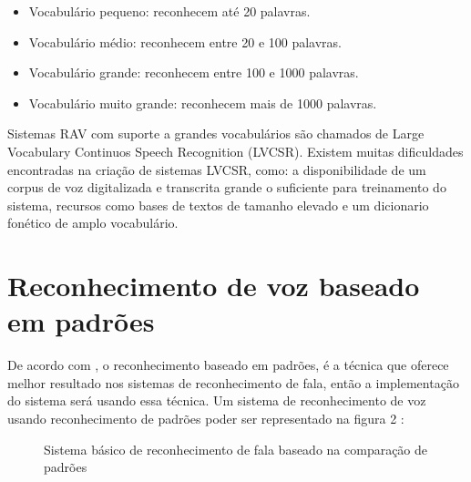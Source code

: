 \begin{enumerate}[(A)]
\begin{itemize}
\item Vocabulário pequeno: reconhecem até 20 palavras. 
\item Vocabulário médio: reconhecem entre 20 e 100 palavras. 
\item Vocabulário grande: reconhecem entre 100 e 1000 palavras. 
\item Vocabulário muito grande: reconhecem mais de 1000 palavras. 
\end{itemize}

Sistemas RAV com suporte a grandes vocabulários são chamados de Large Vocabulary Continuos Speech Recognition (LVCSR). Existem muitas dificuldades encontradas na criação de sistemas LVCSR, como: a disponibilidade de um corpus de voz digitalizada e transcrita grande o suficiente para treinamento do sistema, recursos como bases de textos de
tamanho elevado e um dicionario fonético de amplo vocabulário.


\end{enumerate}

\section{Reconhecimento de voz baseado em padrões}\label{sec:red_neu}
De acordo com , o reconhecimento baseado em padrões, é a técnica que oferece melhor resultado nos sistemas de reconhecimento de fala, então a implementação do sistema será usando essa técnica.
Um sistema de reconhecimento de voz usando reconhecimento de padrões poder ser representado na figura 2 \cite{FundamentRabiner}:
 
\begin{figure}[H]
\centering

\caption{Sistema básico de reconhecimento de fala baseado na comparação de padrões}
\end{figure}

